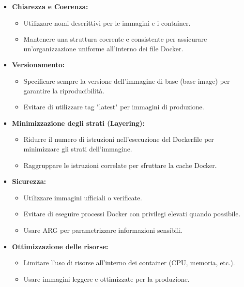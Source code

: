 \begin{itemize}
    \item \textbf{Chiarezza e Coerenza:}
    \begin{itemize}
        \item Utilizzare nomi descrittivi per le immagini e i container.
        \item Mantenere una struttura coerente e consistente per assicurare un'organizzazione uniforme all'interno dei file Docker.
    \end{itemize}

\item \textbf{Versionamento:}
    \begin{itemize}
        \item Specificare sempre la versione dell'immagine di base (base image) per garantire la riproducibilità.
        \item Evitare di utilizzare tag "latest" per immagini di produzione.
    \end{itemize}

\item \textbf{Minimizzazione degli strati (Layering):}
    \begin{itemize}
        \item Ridurre il numero di istruzioni nell'esecuzione del Dockerfile per minimizzare gli strati dell'immagine.
        \item Raggruppare le istruzioni correlate per sfruttare la cache Docker.
    \end{itemize}

\item \textbf{Sicurezza:}
    \begin{itemize}
        \item Utilizzare immagini ufficiali o verificate.
        \item Evitare di eseguire processi Docker con privilegi elevati quando possibile.
        \item Usare ARG per parametrizzare informazioni sensibili.
    \end{itemize}

\item \textbf{Ottimizzazione delle risorse:}
    \begin{itemize}
        \item Limitare l'uso di risorse all'interno dei container (CPU, memoria, etc.).
        \item Usare immagini leggere e ottimizzate per la produzione.
    \end{itemize}


\end{itemize}
